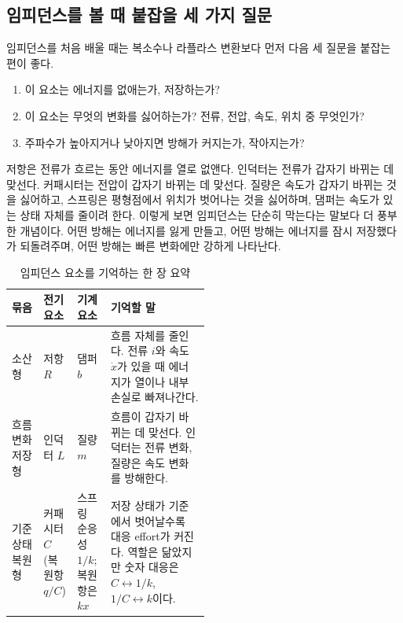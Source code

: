 \subsection{임피던스를 볼 때 붙잡을 세 가지 질문}

임피던스를 처음 배울 때는 복소수나 라플라스 변환보다 먼저 다음 세 질문을 붙잡는 편이 좋다.

\begin{enumerate}
  \item 이 요소는 에너지를 없애는가, 저장하는가?
  \item 이 요소는 무엇의 변화를 싫어하는가? 전류, 전압, 속도, 위치 중 무엇인가?
  \item 주파수가 높아지거나 낮아지면 방해가 커지는가, 작아지는가?
\end{enumerate}

저항은 전류가 흐르는 동안 에너지를 열로 없앤다.
인덕터는 전류가 갑자기 바뀌는 데 맞선다.
커패시터는 전압이 갑자기 바뀌는 데 맞선다.
질량은 속도가 갑자기 바뀌는 것을 싫어하고, 스프링은 평형점에서 위치가 벗어나는 것을 싫어하며, 댐퍼는 속도가 있는 상태 자체를 줄이려 한다.
이렇게 보면 임피던스는 단순히 막는다는 말보다 더 풍부한 개념이다.
어떤 방해는 에너지를 잃게 만들고, 어떤 방해는 에너지를 잠시 저장했다가 되돌려주며, 어떤 방해는 빠른 변화에만 강하게 나타난다.

\begin{table}[!htbp]
  \centering
  \caption{임피던스 요소를 기억하는 한 장 요약}
  \small
  \setlength{\tabcolsep}{3pt}
  \begin{tabularx}{\linewidth}{@{}>{\raggedright\arraybackslash}p{0.16\linewidth}>{\raggedright\arraybackslash}p{0.17\linewidth}>{\raggedright\arraybackslash}p{0.17\linewidth}>{\raggedright\arraybackslash}X@{}}
    \toprule
    묶음 & 전기 요소 & 기계 요소 & 기억할 말 \\
    \midrule
    소산형 & 저항 $R$ & 댐퍼 $b$ & 흐름 자체를 줄인다. 전류 $i$와 속도 $\dot{x}$가 있을 때 에너지가 열이나 내부 손실로 빠져나간다. \\
    흐름 변화 저장형 & 인덕터 $L$ & 질량 $m$ & 흐름이 갑자기 바뀌는 데 맞선다. 인덕터는 전류 변화, 질량은 속도 변화를 방해한다. \\
    기준 상태 복원형 & 커패시터 $C$ (복원항 $q/C$) & 스프링 순응성 $1/k$; 복원항은 $kx$ & 저장 상태가 기준에서 벗어날수록 대응 effort가 커진다. 역할은 닮았지만 숫자 대응은 $C\leftrightarrow 1/k$, $1/C\leftrightarrow k$이다. \\
    \bottomrule
  \end{tabularx}
  \label{tab:impedance-element-memory}
\end{table}

